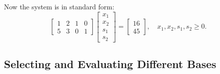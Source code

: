 Now the system is in standard form:
\[
\begin{bmatrix}
    1 & 2 & 1 & 0 \\
    5 & 3 & 0 & 1
\end{bmatrix}
\begin{bmatrix}
    x_1 \\ x_2 \\ s_1 \\ s_2
\end{bmatrix}
=
\begin{bmatrix}
    16 \\ 45
\end{bmatrix}, \quad x_1, x_2, s_1, s_2 \geq 0.
\]

\subsection{Selecting and Evaluating Different Bases}
\label{sec:three-bases}

